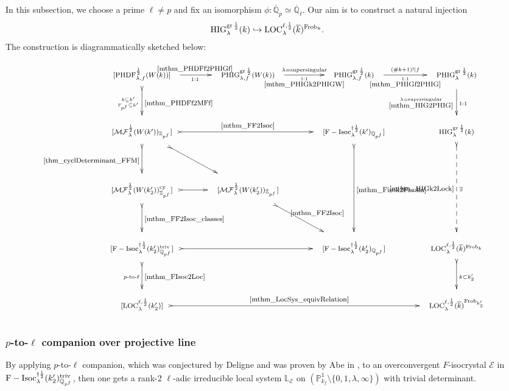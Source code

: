\documentclass[12pt,twoside]{book}
\theoremstyle{plain}
\theoremstyle{definition}
\theoremstyle{remark}
\newcommand{\bF}{{\mathbb F}}
\newcommand{\bL}{{\mathbb L}}
\newcommand{\bP}{{\mathbb P}}
\newcommand{\bQ}{{\mathbb Q}}
\newcommand{\bZ}{{\mathbb Z}}
\newcommand{\mE}{{\mathcal E}}
\newcommand{\MF}{\mathcal{MF}}
\DeclareMathOperator{\FIsoc}{F-Isoc}
\numberwithin{equation}{section}
\def\FIsoch{{\FIsoc^{\dagger{1\over 2}}_{\lambda} }}
\def\High{{\mathrm{HIG}^{{\rm gr}\,{1\over 2}}_{\lambda}}}
\def\Loch{{\mathrm{LOC}^{\ell,{1\over 2}}_{\lambda}}}
\def\MFh{\MF^{{1\over 2}}_{\lambda}}
\def\PHDFhf{\mathrm{PHDF}^{{1\over 2}}_{\lambda,f}}
\def\PHigh{{\mathrm{PHIG}^{{\rm gr}\,{1\over 2}}_{\lambda}}}
\def\PHighf{{\mathrm{PHIG}^{{\rm gr}\,{1\over 2}}_{\lambda,f}}}
\def\Frob{\mathrm{Frob}}
\begin{document}
In this subsection, we choose a prime $\ell\not=p$ and fix an isomorphism $\phi\colon \overline {\bQ}_p\simeq \overline {\bQ}_\ell$. Our aim is to construct a natural injection
\[\High(k) \hookrightarrow \Loch(\overline{k})^{\Frob_k}.\]
The construction is diagrammatically sketched below:
\begin{equation*} \footnotesize
\xymatrix@R=1cm@C=1cm@M=4mm{
[\PHDFhf(W(k))]
\ar@{>->}[d]^{\autoref{mthm_PHDFf2MFf}}_{k\subseteq k' \atop \bF_{p^f}\subseteq k'} \ar[r]^{\autoref{mthm_PHDFf2PHIGf}}_{1:1}
& \PHighf(W(k))
\ar[r]^-{\lambda=\text{supersingular}}_-{1:1\atop \autoref{mthm_PHIGk2PHIGW}}
& \PHighf(k)
\ar[r]_{1:1 \atop \autoref{mthm_PHIGf2PHIG}}^{(\#k+1)!\mid f}
& \PHigh(k)
\ar[d]_{\lambda=\text{supersingular} \atop \autoref{mthm_HIG2PHIG}}^{1:1} \\
[\MFh(W(k'))_{\bZ_{p^f}}]
\ar@{>->}[rr]^{\autoref{mthm_FF2Isoc}}
\ar@{>->}[d]_{\autoref{thm_cyclDeterminant_FFM}}
\ar@{>->}[dr]
&& [\FIsoch(k')_{\bQ_{p^f}}]
\ar@{>->}[dd]^{\autoref{mthm_Fisok2Fisokn}}
& \High(k)
\ar@{>-->}[dd]^-{\exists}_-{\autoref{mthm_HIGk2Lock}} \\
[\MFh(W(k_2'))_{\bZ_{p^f}}^{\rm cy}]
\ar@{>->}[d]^{\autoref{mthm_FF2Isoc_classes}}
\ar@{>->}[r]
& [\MFh(W(k_2'))_{\bZ_{p^f}}]
\ar@{>->}[dr]^{\autoref{mthm_FF2Isoc}}
&\\
[\FIsoch(k'_2)_{\bQ_{p^f}}^{\mathrm{triv}}]
\ar@{>->}[rr] \ar@{>->}[d]_{p\text{-to-}\ell}^{\autoref{mthm_FIsoc2Loc}}
&
&[\FIsoch(k'_2)_{\bQ_{p^f}}]
& \Loch(\overline{k})^{\Frob_k}
\ar@{>->}[d]^{k\subset k'_2}\\
[\Loch(k'_2)]
\ar@{>->}[rrr]^{\autoref{mthm_LocSys_equivRelation}}
&
&
& \Loch(\overline{k})^{\Frob_{k'_2}} \\
}
\end{equation*}

\subsubsection{$p$-to-$\ell$ companion over projective line}

By applying $p$-to-$\ell$ companion, which was conjectured by Deligne and was proven by Abe in \cite{Abe18}, to an overconvergent $F$-isocrystal $\mE$ in $\FIsoch(k'_2)_{\bQ_{p^f}}^{\rm triv}$, then one gets a rank-2 $\ell$-adic irreducible local system $\bL_{\mE}$ on $(\bP_{k_f}^1\setminus \{0,1,\lambda,\infty\})$ with trivial determinant.
\end{document}
